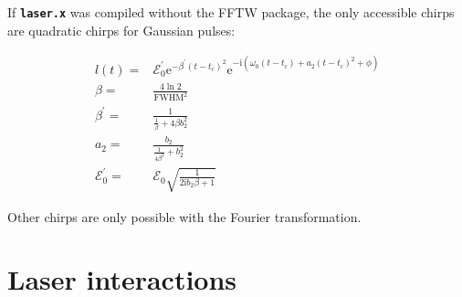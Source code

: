 \documentclass[a4paper,11pt,DIV=15,openany,twoside=false]{scrbook}
\newcommand{\tthdump}[1]{#1}
\newcommand{\ttt}[1]{\textbf{\texttt{#1}}}
\newcommand{\E}{\ensuremath{\mathrm{e}}}
\newcommand{\I}{\ensuremath{\mathrm{i}}}
\begin{document}
If \ttt{laser.x} was compiled without the FFTW package, the only accessible chirps are quadratic chirps for Gaussian pulses:
\tthdump{
  \begin{align}
    l(t)=&
    \mathcal{E}_0^\prime
    \E^{-\beta^\prime(t-t_c)^2}
    \E^{-\I\left(
      \omega_0(t-t_c)+a_2(t-t_c)^2+\phi
    \right)}\\
    \beta=&\frac{4\ln 2}{\mathrm{FWHM}^2}\\
    \beta^\prime=&\frac{1}{\frac{1}{\beta}+4\beta b_2^2}\\
    a_2=&\frac{b_2}{\frac{1}{4\beta^2}+b^2_2}\\
    \mathcal{E}_0^\prime=&\mathcal{E}_0\sqrt{\frac{1}{2\I b_2\beta+1}}
  \end{align}
}
Other chirps are only possible with the Fourier transformation.


\section{Laser interactions}\label{met:laser}
\end{document}
